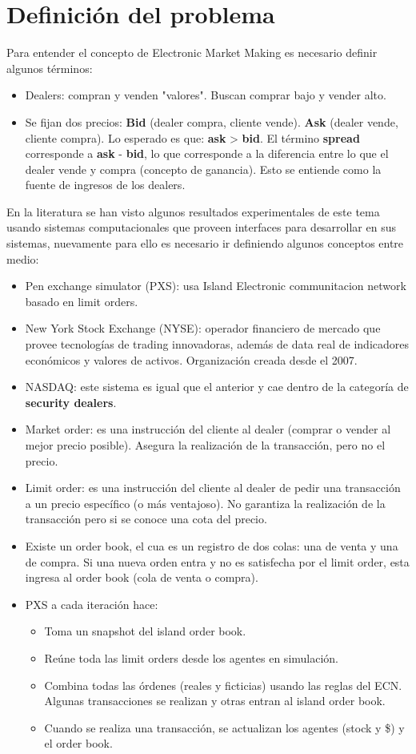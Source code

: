 \section{Definición del problema}
Para entender el concepto de Electronic Market Making es necesario definir algunos términos: \cite{glosten1985bid}
\begin{itemize}
	\item Dealers: compran y venden "valores". Buscan comprar bajo y vender alto.
	\item Se fijan dos precios: \textbf{Bid} (dealer compra, cliente vende). \textbf{Ask} (dealer vende, cliente compra). Lo esperado es que: 
		\textbf{ask} > \textbf{bid}. El término \textbf{spread} corresponde a \textbf{ask} - \textbf{bid}, lo que corresponde a la diferencia entre lo que
		el dealer vende y compra (concepto de ganancia). Esto se entiende como la fuente de ingresos de los dealers. \cite{ho1981optimal}
\end{itemize}
En la literatura se han visto algunos resultados experimentales de este tema usando sistemas computacionales que proveen interfaces para desarrollar en sus sistemas, 
nuevamente para ello es necesario ir definiendo algunos conceptos entre medio:
\begin{itemize}
	\item Pen exchange simulator (PXS): usa Island Electronic communitacion network basado en limit orders.
	\item New York Stock Exchange (NYSE): operador financiero de mercado que provee tecnologías de trading innovadoras, además de data real
		de indicadores económicos y valores de activos. Organización creada desde el 2007.
	\item NASDAQ: este sistema es igual que el anterior y cae dentro de la categoría de \textbf{security dealers}. \cite{barclay1999effects}
	\item Market order: es una instrucción del cliente al dealer (comprar o vender al mejor precio posible). Asegura la realización de la transacción, 
		pero no el precio.
	\item Limit order: es una instrucción del cliente al dealer de pedir una transacción a un precio específico (o más ventajoso). 
		No garantiza la realización de la transacción pero si se conoce una cota del precio.
	\item Existe un order book, el cua es un registro de dos colas: una de venta y una de compra. Si una nueva orden entra y no es satisfecha por el limit order, 
		esta ingresa al order book (cola de venta o compra).
	\item PXS a cada iteración hace:
	\begin{itemize}
		\item Toma un snapshot del island order book.
		\item Reúne toda las limit orders desde los agentes en simulación.
		\item Combina todas las órdenes (reales y ficticias) usando las reglas del ECN. Algunas transacciones se realizan y otras entran al island order book.
		\item Cuando se realiza una transacción, se actualizan los agentes (stock y \$) y el order book.
	\end{itemize}
\end{itemize}
